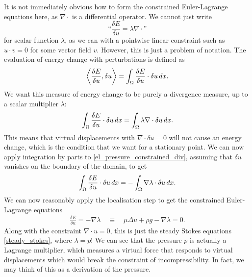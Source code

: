 It is not immediately obvious how to form the constrained Euler-Lagrange equations here, as $\nabla\cdot$ is a differential operator.
We cannot just write
    $$\text{``}\frac{\delta E}{\delta u} = \lambda\nabla\cdot\text{''}$$
for scalar function $\lambda$, as we can with a pointwise linear constraint such as $u\cdot v = 0$ for some vector field $v$. However, this is just a problem of
notation. The evaluation of energy change with perturbations is defined as
\begin{align*}
    \left<\frac{\delta E}{\delta u}, \delta u\right> = \int_\Omega \frac{\delta E}{\delta u}\cdot\delta u\,dx.
\end{align*}
We want this measure of energy change to be purely a divergence measure, up to a scalar multiplier $\lambda$:
\begin{equation}\label{el_pressure_constrained_div}
    \int_\Omega \frac{\delta E}{\delta u}\cdot\delta u\,dx = \int_{\Omega} \lambda \nabla\cdot \delta u\,dx.
\end{equation}
This means
that virtual displacements with $\nabla\cdot\delta u = 0$ will not cause an energy change, which is the condition that
we want for a stationary point.
We can now apply integration by parts to \eqref{el_pressure_constrained_div}, assuming that $\delta u$ vanishes on the boundary of the domain, to get
\begin{equation}
    \int_\Omega \frac{\delta E}{\delta u}\cdot\delta u\,dx = -\int_{\Omega} \nabla\lambda \cdot \delta u\,dx.
\end{equation}
We can now reasonably apply the localisation step to get the constrained Euler-Lagrange equations
\begin{equation}
\begin{split}
           \frac{\delta E}{\delta u} = -\nabla \lambda
    \quad\equiv\quad \mu\Delta u + \rho g - \nabla \lambda = 0.
\end{split}
\end{equation}
Along with the constraint $\nabla\cdot u = 0$, this is just the steady Stokes equations \eqref{steady_stokes}, where $\lambda = p$! We can see that the pressure $p$
is actually
a Lagrange multiplier, which measures a virtual force that responds to virtual displacements which would break the constraint of incompressibility.
In fact, we may think of this as a derivation of the pressure.

